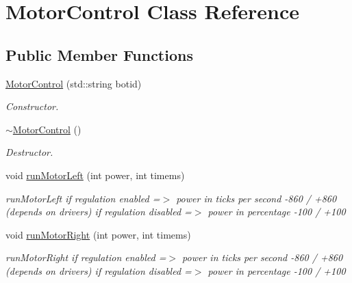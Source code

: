 \hypertarget{classMotorControl}{}\section{Motor\+Control Class Reference}
\label{classMotorControl}
\subsection*{Public Member Functions}
\begin{DoxyCompactItemize}
\item 
\mbox{\label{classMotorControl_a680f53472277d5ea4665be9992ecc7e9}} 
\hyperlink{classMotorControl_a680f53472277d5ea4665be9992ecc7e9}{Motor\+Control} (std\+::string botid)
\begin{DoxyCompactList}\small\item\em Constructor. \end{DoxyCompactList}\item 
\mbox{\label{classMotorControl_a5bc78d24ed52a012a3f81cd3b62216f3}} 
\hyperlink{classMotorControl_a5bc78d24ed52a012a3f81cd3b62216f3}{$\sim$\+Motor\+Control} ()
\begin{DoxyCompactList}\small\item\em Destructor. \end{DoxyCompactList}\item 
\mbox{\label{classMotorControl_ac284030a5da7a30efcb4a7966e1ad5a4}} 
void \hyperlink{classMotorControl_ac284030a5da7a30efcb4a7966e1ad5a4}{run\+Motor\+Left} (int power, int timems)
\begin{DoxyCompactList}\small\item\em run\+Motor\+Left if regulation enabled =$>$ power in ticks per second -\/860 / +860 (depends on drivers) if regulation disabled =$>$ power in percentage -\/100 / +100 \end{DoxyCompactList}\item 
\mbox{\label{classMotorControl_af0d9aad62ad5cfa1df62f2fc4caba690}} 
void \hyperlink{classMotorControl_af0d9aad62ad5cfa1df62f2fc4caba690}{run\+Motor\+Right} (int power, int timems)
\begin{DoxyCompactList}\small\item\em run\+Motor\+Right if regulation enabled =$>$ power in ticks per second -\/860 / +860 (depends on drivers) if regulation disabled =$>$ power in percentage -\/100 / +100 \end{DoxyCompactList}\item 

\end{DoxyCompactItemize}
